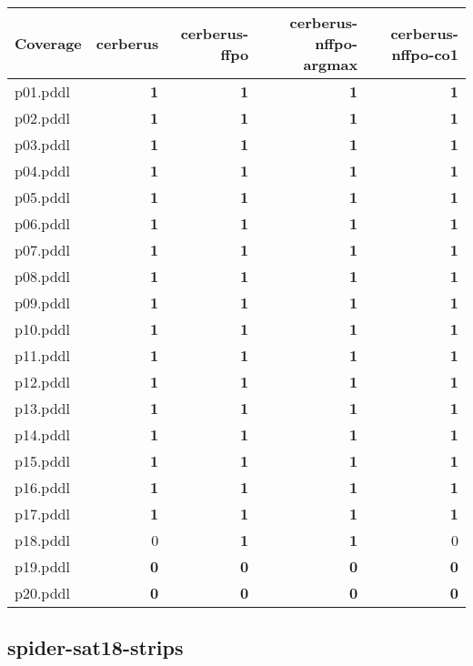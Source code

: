 \documentclass{article}
\begin{document}
\begin{tabular}{@{}lrrrr@{}}
Coverage & cerberus & cerberus-ffpo & cerberus-nffpo-argmax & cerberus-nffpo-co1 \\
\midrule
p01.pddl & \textbf{1} & \textbf{1} & \textbf{1} & \textbf{1} \\
p02.pddl & \textbf{1} & \textbf{1} & \textbf{1} & \textbf{1} \\
p03.pddl & \textbf{1} & \textbf{1} & \textbf{1} & \textbf{1} \\
p04.pddl & \textbf{1} & \textbf{1} & \textbf{1} & \textbf{1} \\
p05.pddl & \textbf{1} & \textbf{1} & \textbf{1} & \textbf{1} \\
p06.pddl & \textbf{1} & \textbf{1} & \textbf{1} & \textbf{1} \\
p07.pddl & \textbf{1} & \textbf{1} & \textbf{1} & \textbf{1} \\
p08.pddl & \textbf{1} & \textbf{1} & \textbf{1} & \textbf{1} \\
p09.pddl & \textbf{1} & \textbf{1} & \textbf{1} & \textbf{1} \\
p10.pddl & \textbf{1} & \textbf{1} & \textbf{1} & \textbf{1} \\
p11.pddl & \textbf{1} & \textbf{1} & \textbf{1} & \textbf{1} \\
p12.pddl & \textbf{1} & \textbf{1} & \textbf{1} & \textbf{1} \\
p13.pddl & \textbf{1} & \textbf{1} & \textbf{1} & \textbf{1} \\
p14.pddl & \textbf{1} & \textbf{1} & \textbf{1} & \textbf{1} \\
p15.pddl & \textbf{1} & \textbf{1} & \textbf{1} & \textbf{1} \\
p16.pddl & \textbf{1} & \textbf{1} & \textbf{1} & \textbf{1} \\
p17.pddl & \textbf{1} & \textbf{1} & \textbf{1} & \textbf{1} \\
p18.pddl & 0 & \textbf{1} & \textbf{1} & 0 \\
p19.pddl & \textbf{0} & \textbf{0} & \textbf{0} & \textbf{0} \\
p20.pddl & \textbf{0} & \textbf{0} & \textbf{0} & \textbf{0} \\
\end{tabular}

\hypertarget{coverage-spider-sat18-strips}{}
\subsection*{spider-sat18-strips}
\end{document}
